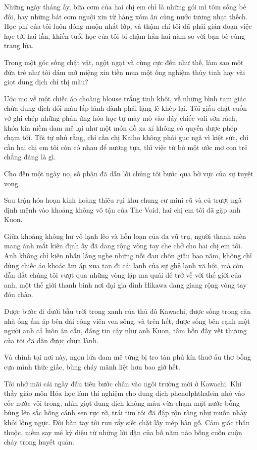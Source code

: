\documentclass[../main.tex]{subfiles}
\begin{document}
Những ngày tháng ấy, bữa cơm của hai chị em chỉ là những gói mì tôm sống bẻ đôi, hay những bát cơm nguội xin từ hàng xóm ăn cùng nước tương nhạt thếch. Học phí của tôi luôn đóng muộn nhất lớp, và thậm chí tôi đã phải gián đoạn việc học tới hai lần, khiến tuổi học của tôi bị chậm hẳn hai năm so với bạn bè cùng trang lứa.

Trong một góc sống chật vật, ngột ngạt và cùng cực đến như thế, làm sao một đứa trẻ như tôi dám mở miệng xin tiền mua một ống nghiệm thủy tinh hay vài giọt dung dịch chỉ thị màu?

Ước mơ về một chiếc áo choàng blouse trắng tinh khôi, về những bình tam giác chứa dung dịch đổi màu lấp lánh đành phải lặng lẽ khép lại. Tôi giấu chặt cuốn vở ghi chép những phản ứng hóa học tự mày mò vào đáy chiếc vali sờn rách, khóa kín niềm đam mê lại như một món đồ xa xỉ không có quyền được phép chạm tới. Tôi tự nhủ rằng, chỉ cần chị Kaiho không phải gục ngã vì kiệt sức, chỉ cần hai chị em tôi còn có nhau để nương tựa, thì việc từ bỏ một ước mơ con trẻ chẳng đáng là gì.

\ct

Cho đến một ngày nọ, số phận đã dẫn lối chúng tôi bước qua bờ vực của sự tuyệt vọng.

Sau trận hỏa hoạn kinh hoàng thiêu rụi khu chung cư mini cũ và cú trượt ngã định mệnh vào khoảng không vô tận của The Void, hai chị em tôi đã gặp anh Kuon.

Giữa khoảng không hư vô lạnh lẽo và hỗn loạn của đa vũ trụ, người thanh niên mang ánh mắt kiên định ấy đã dang rộng vòng tay che chở cho hai chị em tôi. Anh không chỉ kiên nhẫn lắng nghe những nỗi đau chôn giấu bao năm, không chỉ dùng chiếc áo khoác ấm áp xua tan đi cái lạnh của sự ghẻ lạnh xã hội, mà còn dẫn dắt chúng tôi vượt qua những vòng lặp ma quái để trở về với thế giới của anh, một thế giới thanh bình nơi đại gia đình Hikawa đang giang rộng vòng tay đón chào.

Được bước đi dưới bầu trời trong xanh của thủ đô Kawachi, được sống trong căn nhà ống ấm áp bên dải công viên ven sông, và trên hết, được sống bên cạnh một người anh cả luôn ân cần, đáng tin cậy như anh Kuon, tâm hồn đầy vết thương của tôi đã dần được chữa lành.

Và chính tại nơi này, ngọn lửa đam mê từng bị tro tàn phủ kín thuở ấu thơ bỗng cựa mình thức giấc, bùng cháy mãnh liệt hơn bao giờ hết.

Tôi nhớ mãi cái ngày đầu tiên bước chân vào ngôi trường mới ở Kawachi. Khi thầy giáo môn Hóa học làm thí nghiệm cho dung dịch phenolphthalein nhỏ vào cốc nước vôi trong, nhìn giọt dung dịch không màu vừa chạm mặt nước bỗng bùng lên sắc hồng cánh sen rực rỡ, trái tim tôi đã đập rộn ràng như muốn nhảy khỏi lồng ngực. Đôi bàn tay tôi run rẩy siết chặt lấy mép bàn gỗ. Cảm giác thân thuộc, niềm say mê kỳ diệu từ những lời dặn của bố năm nào bỗng cuồn cuộn chảy trong huyết quản.
\end{document}
